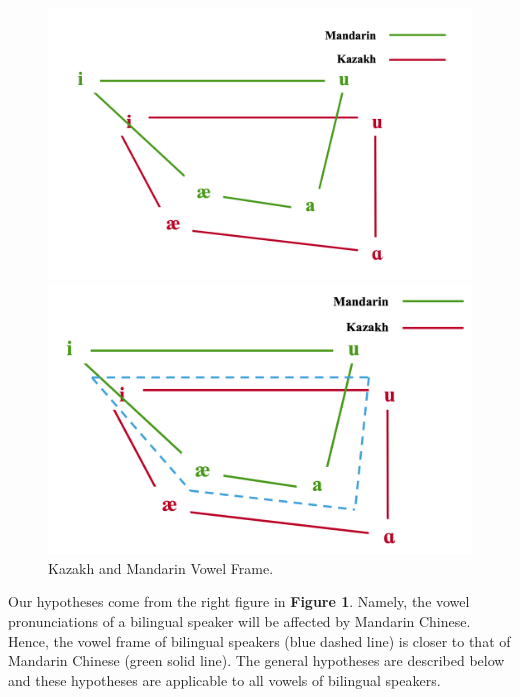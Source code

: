 \documentclass[
  man,floatsintext]{apa6}
\begin{document}
\begin{figure}[ht]
\centering
\begin{minipage}{0.48\textwidth}
  \includegraphics[width=\linewidth]{finalimages/vowels2.png}
\end{minipage}
\hfill
\begin{minipage}{0.40\textwidth}
  \includegraphics[width=\linewidth]{finalimages/vowels3.png}
\end{minipage}
\caption{Kazakh and Mandarin Vowel Frame.}
\end{figure}

Our hypotheses come from the right figure in \textbf{Figure 1}. Namely, the vowel pronunciations of a bilingual speaker will be affected by Mandarin Chinese. Hence, the vowel frame of bilingual speakers (blue dashed line) is closer to that of Mandarin Chinese (green solid line). The general hypotheses are described below and these hypotheses are applicable to all vowels of bilingual speakers.
\end{document}

